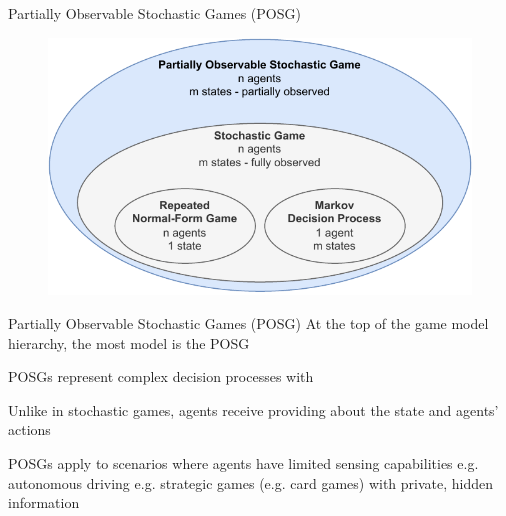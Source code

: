 \begin{frame}{Partially Observable Stochastic Games (POSG)}

\begin{figure}
    \centering
    \includegraphics{images/chapter_3/POSG_hierarchy.pdf}
\end{figure}
    
\end{frame}

\begin{frame}{Partially Observable Stochastic Games (POSG)}
    At the top of the game model hierarchy, the most  model is the POSG
    \blist
        \item POSGs represent complex decision processes with 
        \item Unlike in stochastic games, agents receive  providing  about the state and agents' actions
        \item POSGs apply to scenarios where agents have limited sensing capabilities
       		\listtab e.g. autonomous driving
            \listtab e.g. strategic games (e.g. card games) with private, hidden information
    \elist
    
\end{frame}

